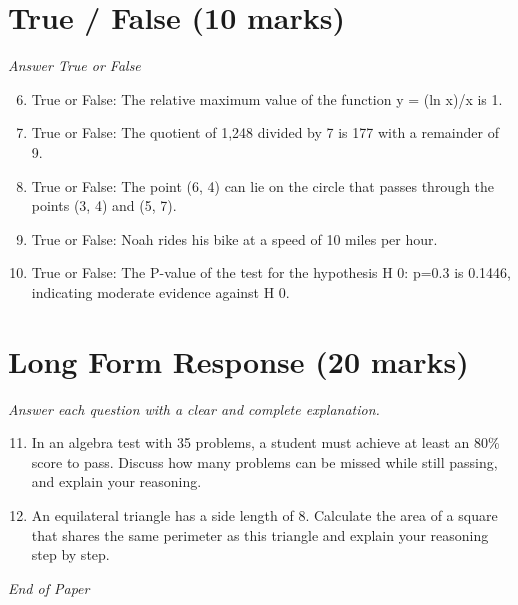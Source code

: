 \documentclass[12pt]{article}
\begin{document}
\section*{True / False (10 marks)}
\textit{Answer True or False}
\begin{enumerate}[label=\arabic*.]
\setcounter{enumi}{5}
\item True or False: The relative maximum value of the function y = (ln x)/x is 1.
\item True or False: The quotient of 1,248 divided by 7 is 177 with a remainder of 9.
\item True or False: The point (6, 4) can lie on the circle that passes through the points (3, 4) and (5, 7).
\item True or False: Noah rides his bike at a speed of 10 miles per hour.
\item True or False: The P-value of the test for the hypothesis H 0: p=0.3 is 0.1446, indicating moderate evidence against H 0.
\end{enumerate}

\section*{Long Form Response (20 marks)}
\textit{Answer each question with a clear and complete explanation.}
\begin{enumerate}[label=\arabic*.]
\setcounter{enumi}{10}
\item In an algebra test with 35 problems, a student must achieve at least an 80\% score to pass. Discuss how many problems can be missed while still passing, and explain your reasoning.
\item An equilateral triangle has a side length of 8. Calculate the area of a square that shares the same perimeter as this triangle and explain your reasoning step by step.
\end{enumerate}

\vfill
\noindent\textit{End of Paper}
\end{document}

